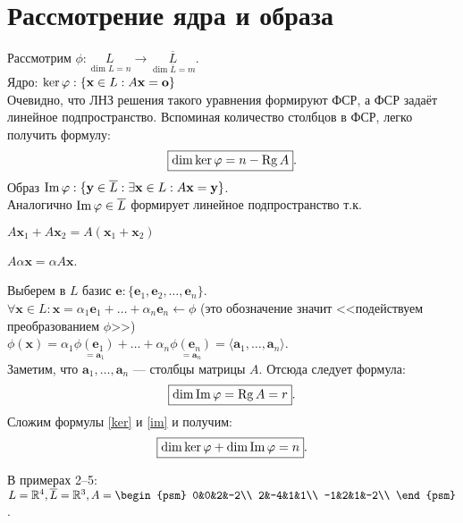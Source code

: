 \section{Рассмотрение ядра и образа}
Рассмотрим $\phi: \underset{\dim L=n}{L}\rightarrow \underset{\dim \overline{L}=m}{\overline{L}}$.\\
Ядро: $\ker\phi: \{\textbf{x} \in L: A\textbf{\textbf{x}}=\textbf{o}\}$\\
Очевидно, что ЛНЗ решения такого уравнения формируют ФСР, а ФСР задаёт линейное подпространство. Вспоминая количество столбцов в ФСР, легко получить формулу:
\begin{equation}
\boxed{\dim\ker\phi=n-\Rg A}.
\label{ker}
\end{equation}
Образ $\im\phi: \{\textbf{y} \in \overline{L}:\exists \textbf{x}\in L: A\textbf{x}=\textbf{y}\}$.\\
Аналогично $\im\phi \in \overline{L}$ формирует линейное подпространство т.к.
\begin{center}
	$
	A\textbf{x$_1$}+A\textbf{x$_2$}=A(\textbf{x$_1$}+\textbf{x$_2$})$
	
	$A\alpha \textbf{x}=\alpha A\textbf{x}$.
\end{center}
Выберем в $L$ базис $\textbf{e}:\{\textbf{e$_1$}, \textbf{e$_2$}, \dots, \textbf{e$_n$}\}$.\\
$\forall \textbf{x} \in L: \textbf{x}=\alpha_1\textbf{e$_1$}+\dots+\alpha_n\textbf{e$_n$} \leftarrow \phi$ (это обозначение значит <<подействуем преобразованием $\phi$>>)\\
$\phi(\textbf{x})=\alpha_1 \underset{=\textbf{a$_1$}}{\phi(\textbf{e$_1$})}+\dots+\alpha_n \underset{=\textbf{a$_n$}}{\phi(\textbf{e$_n$})}=\langle \textbf{a$_1$},\dots, \textbf{a$_n$}\rangle$.\\
Заметим, что $\textbf{a$_1$},\dots, \textbf{a$_n$}$ --- столбцы матрицы $A$. Отсюда следует формула:
\begin{equation}
\boxed{\dim\im\phi=\Rg A=r}.
\label{im}
\end{equation}
Сложим формулы \eqref{ker} и \eqref{im} и получим:
\begin{equation}
\boxed{\dim\ker\phi+\dim\im\phi=n}.
\end{equation}
\begin{center}
	В примерах 2--5: $L=\mathbb{R}^4, \overline{L}=\mathbb{R}^3, A=\begin{psm}
	0&0&2&-2\\
	2&-4&1&1\\
	-1&2&1&-2\\
	\end{psm}$.
\end{center}
